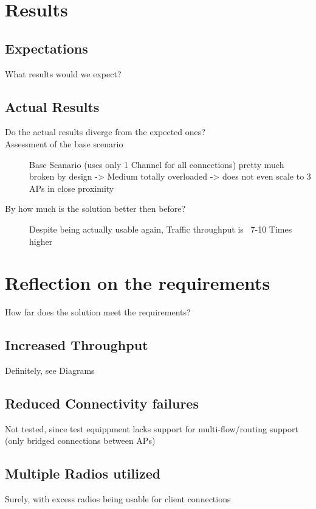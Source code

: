 \section{Results}
  \subsection{Expectations}
    What results would we expect?\newline
  \subsection{Actual Results}
    \begin{description}
     \item [Do the actual results diverge from the expected ones?]
     \item[Assessment of the base scenario]
      Base Scanario (uses only 1 Channel for all connections) pretty much broken by design -> Medium totally overloaded -> does not even scale to 3 APs in close proximity \newline
     \item[By how much is the solution better then before?]
      Despite being actually usable again, Traffic throughput is ~7-10 Times higher
    \end{description}
\section{Reflection on the requirements}
  How far does the solution meet the requirements?\newline
  \subsection{Increased Throughput}
    Definitely, see Diagrams \newline
  \subsection{Reduced Connectivity failures}
    Not tested, since test equippment lacks support for multi-flow/routing support (only bridged connections between APs) \newline
  \subsection{Multiple Radios utilized}
    Surely, with excess radios being usable for client connections \newline
